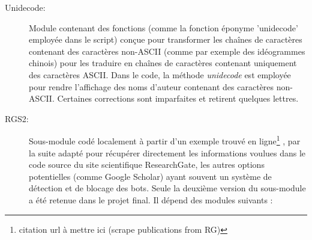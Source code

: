\documentclass{book}
\begin{document}
\begin{description}
    \item[Unidecode:] Module contenant des fonctions (comme la fonction éponyme
        'unidecode' employée dans le script) conçue pour transformer les chaînes de
        caractères contenant des caractères non-ASCII (comme par exemple des
        idéogrammes chinois) pour les traduire en chaînes de caractères contenant
        uniquement des caractères ASCII. Dans le code, la méthode \textit{unidecode}
        est employée pour rendre l'affichage des noms d'auteur contenant des caractères
        non-ASCII. Certaines corrections sont imparfaites et retirent quelques lettres.

    \item[RGS2:] Sous-module codé localement à partir d'un exemple trouvé en
        ligne\footnote{citation url à mettre ici (scrape publications from RG)}
        , par la suite adapté pour récupérer directement les informations
        voulues dans le code source du site scientifique ResearchGate, les autres
        options potentielles (comme Google Scholar) ayant souvent un système de
        détection et de blocage des bots. Seule la deuxième version du sous-module a
        été retenue dans le projet final. Il dépend des modules suivants :
        

\end{description}
\end{document}
